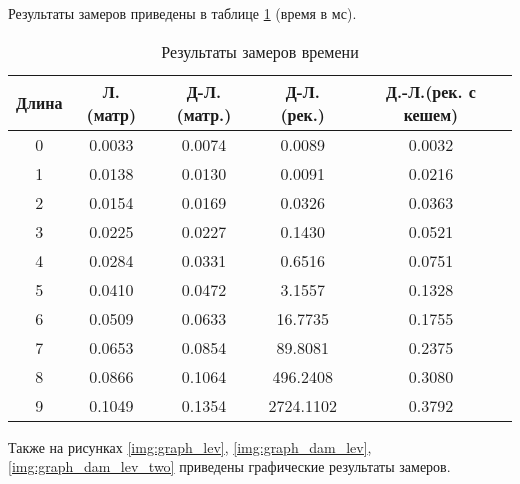 Результаты замеров приведены в таблице \ref{tbl:time_mes} (время в мс).

\begin{table}[h]
    \begin{center}
        \begin{threeparttable}
        \captionsetup{justification=raggedright,singlelinecheck=off}
        \caption{Результаты замеров времени}
        \label{tbl:time_mes}
        \begin{tabular}{|c|c|c|c|c|}
            \hline
            Длина & Л.(матр) & Д-Л.(матр.)& Д-Л.(рек.) & Д.-Л.(рек. с кешем)  \\
            \hline
            0 & 0.0033 & 0.0074 & 0.0089 & 0.0032 \\
            \hline
            1 & 0.0138 & 0.0130 & 0.0091 & 0.0216 \\ 
            \hline
            2 & 0.0154 & 0.0169 & 0.0326 & 0.0363 \\ 
            \hline
            3 & 0.0225 & 0.0227 & 0.1430 & 0.0521 \\ 
            \hline
            4 & 0.0284 & 0.0331 & 0.6516 & 0.0751 \\ 
            \hline
            5 & 0.0410 & 0.0472 & 3.1557 & 0.1328 \\ 
            \hline
            6 & 0.0509 & 0.0633 & 16.7735 & 0.1755 \\ 
            \hline
            7 & 0.0653 & 0.0854 & 89.8081 & 0.2375 \\ 
            \hline
            8 & 0.0866 & 0.1064 & 496.2408 & 0.3080 \\ 
            \hline
            9 & 0.1049 & 0.1354 & 2724.1102 & 0.3792 \\ 
            \hline
		\end{tabular}
    \end{threeparttable}
\end{center}
\end{table}

Также на рисунках \ref{img:graph_lev}, \ref{img:graph_dam_lev}, \ref{img:graph_dam_lev_two} приведены графические результаты замеров.



